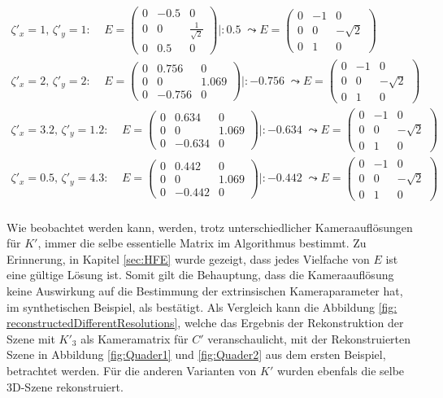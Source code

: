 \begin{gather*}
	\zeta'_x = 1, \, \zeta'_y = 1: \; \; \;\;
	E = \begin{pmatrix}
		0&-0.5&0\\
		0&0&\frac{1}{\sqrt{2}}\\
		0&0.5&0
	\end{pmatrix} |: 0.5 \; \leadsto
	E = \begin{pmatrix}
		0&-1&0\\
		0&0&-\sqrt{2}\\
		0&1&0
	\end{pmatrix}\\
	\zeta'_x = 2, \, \zeta'_y = 2: \; \; \;\;
	E = \begin{pmatrix}
		0&0.756&0\\
		0&0&1.069\\
		0&-0.756&0
	\end{pmatrix} |: -0.756 \; \leadsto
	E = \begin{pmatrix}
		0&-1&0\\
		0&0&-\sqrt{2}\\
		0&1&0
	\end{pmatrix}\\
	\zeta'_x = 3.2, \, \zeta'_y = 1.2: \; \; \;\;
	E = \begin{pmatrix}
		0&0.634&0\\
		0&0&1.069\\
		0&-0.634&0
	\end{pmatrix} |: -0.634 \; \leadsto
	E = \begin{pmatrix}
		0&-1&0\\
		0&0&-\sqrt{2}\\
		0&1&0
	\end{pmatrix}\\
	\zeta'_x = 0.5, \, \zeta'_y = 4.3: \; \; \;\;
	E = \begin{pmatrix}
		0&0.442&0\\
		0&0&1.069\\
		0&-0.442&0
	\end{pmatrix} |: -0.442 \; \leadsto
	E = \begin{pmatrix}
		0&-1&0\\
		0&0&-\sqrt{2}\\
		0&1&0
	\end{pmatrix}\\
\end{gather*}

Wie beobachtet werden kann, werden, trotz unterschiedlicher Kameraauflösungen für $K'$, immer die selbe essentielle Matrix im Algorithmus bestimmt. Zu Erinnerung, in Kapitel \ref{sec:HFE} wurde gezeigt, dass jedes Vielfache von $E$ ist eine gültige Lösung ist. Somit gilt die Behauptung, dass die Kameraauflösung keine Auswirkung auf die Bestimmung der extrinsischen Kameraparameter hat, im synthetischen Beispiel, als bestätigt. Als Vergleich kann die Abbildung \ref{fig: reconstructedDifferentResolutions}, welche das Ergebnis der Rekonstruktion der Szene mit $K'_3$ als Kameramatrix für $C'$ veranschaulicht, mit der Rekonstruierten Szene in Abbildung 	\ref{fig:Quader1} und \ref{fig:Quader2} aus dem ersten Beispiel, betrachtet werden. Für die anderen Varianten von $K'$ wurden ebenfals die selbe 3D-Szene rekonstruiert.\\ 


